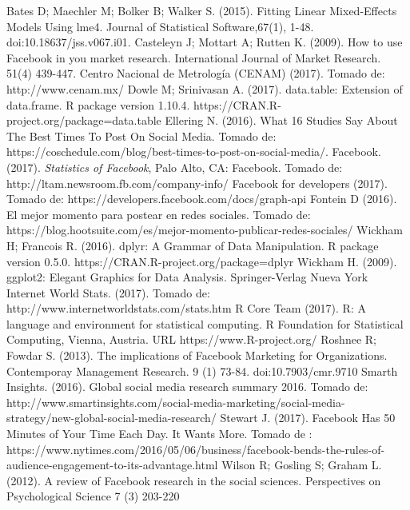 \documentclass[a4paper,10pt]{article}
\begin{document}
\begin{thebibliography}{20}
    Bates D; Maechler M; Bolker B; Walker S. (2015). Fitting Linear Mixed-Effects Models Using lme4. Journal of Statistical Software,67(1), 1-48. doi:10.18637/jss.v067.i01.
   Casteleyn J; Mottart A; Rutten K. (2009). How to use Facebook in you market research. International Journal of Market Research. 51(4) 439-447.
   Centro Nacional de Metrología (CENAM) (2017). Tomado de: http://www.cenam.mx/
    Dowle M; Srinivasan A. (2017). data.table: Extension of  data.frame. R package version 1.10.4. https://CRAN.R-project.org/package=data.table
    Ellering N. (2016). What 16 Studies Say About The Best Times To Post On Social Media. Tomado de: https://coschedule.com/blog/best-times-to-post-on-social-media/.
   Facebook. (2017). \textit{ Statistics of  Facebook}, Palo  Alto,  CA:  Facebook. Tomado de: http://ltam.newsroom.fb.com/company-info/
   Facebook for developers (2017). Tomado de: https://developers.facebook.com/docs/graph-api
    Fontein D (2016). El mejor momento para postear en redes sociales. Tomado de: https://blog.hootsuite.com/es/mejor-momento-publicar-redes-sociales/
    Wickham H; Francois R. (2016). dplyr: A Grammar of Data Manipulation. R package version 0.5.0. https://CRAN.R-project.org/package=dplyr
    Wickham H. (2009). ggplot2: Elegant Graphics for Data Analysis. Springer-Verlag Nueva York
   Internet World Stats. (2017). Tomado de: http://www.internetworldstats.com/stats.htm
   R Core Team (2017). R: A language and environment for statistical computing. R Foundation for Statistical Computing, Vienna, Austria. URL https://www.R-project.org/
   Roshnee R; Fowdar S. (2013). The implications of Facebook Marketing for Organizations. Contemporay Management Research. 9 (1) 73-84. doi:10.7903/cmr.9710 
   Smarth Insights. (2016). Global social media research summary 2016. Tomado de: http://www.smartinsights.com/social-media-marketing/social-media-strategy/new-global-social-media-research/
   Stewart J. (2017). Facebook Has 50 Minutes of Your Time Each Day. It Wants More. Tomado de : https://www.nytimes.com/2016/05/06/business/facebook-bends-the-rules-of-audience-engagement-to-its-advantage.html
    Wilson R; Gosling S; Graham L. (2012). A review of Facebook research in the social sciences. Perspectives on Psychological Science 7 (3) 203-220
\end{thebibliography}
\end{document}
